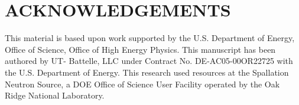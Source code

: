 \documentclass[letterpaper,
               keeplastbox,
               nospread,
               biblatex,
              ]{jacow}
\begin{document}
\section{ACKNOWLEDGEMENTS}
This material is based upon work supported by the U.S. Department of Energy, Office of Science, Office of High Energy Physics.
This manuscript has been authored by UT- Battelle, LLC under Contract No. DE-AC05-00OR22725 with the U.S. Department of Energy. This research used resources at the Spallation Neutron Source, a DOE Office of Science User Facility operated by the Oak Ridge National Laboratory.





\printbibliography
\end{document}
